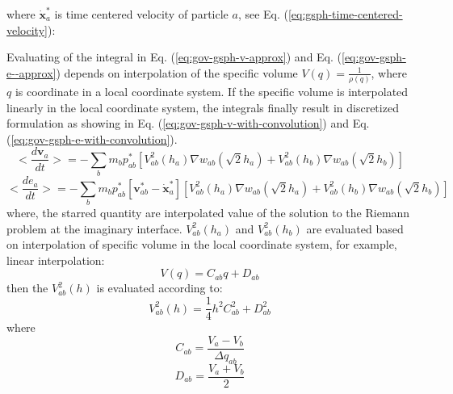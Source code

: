where $\dot{\textbf{x}}_{a}^{\ast}$ is time centered velocity of particle $a$, see Eq. (\ref{eq:gsph-time-centered-velocity}):

Evaluating of the integral in Eq. (\ref{eq:gov-gsph-v-approx}) and Eq. (\ref{eq:gov-gsph-e--approx}) depends on interpolation of the specific volume $V(q) = \frac{1}{\rho(q)}$, where $q$ is coordinate in a local coordinate system. If the specific volume is interpolated linearly in the local coordinate system, the integrals finally result in discretized formulation as showing in Eq. (\ref{eq:gov-gsph-v-with-convolution}) and Eq. (\ref{eq:gov-gsph-e-with-convolution}).
\begin{equation}
<\dfrac{d \textbf{v}_{a}}{dt}>= -\sum_{b} m_{b} p_{a b}^{\ast} \left[ V_{ab}^2(h_a) \nabla w_{a b}(\sqrt{2} h_{a}) + V_{ab}^2(h_b) \nabla w_{a b}(\sqrt{2} h_{b}) \right]
\label{eq:gov-gsph-v-with-convolution}
\end{equation}
\begin{equation}
<\dfrac{d e_{a}}{dt}>= - \sum_{b} m_{b} p_{a b}^{\ast} [\textbf{v}_{a b}^{\ast} - \dot{\textbf{x}}_{a}^{\ast}] \left[V_{ab}^2(h_a) \nabla w_{a b}(\sqrt{2} h_{a}) + V_{ab}^2(h_b) \nabla w_{a b}(\sqrt{2} h_{b}) \right]
\label{eq:gov-gsph-e-with-convolution}
\end{equation}
where, the starred quantity are interpolated value of the solution to the Riemann problem at the imaginary interface.
$V_{ab}^2(h_a)$ and $V_{ab}^2(h_b)$ are evaluated based on interpolation of specific volume in the local coordinate system, for example, linear interpolation: 
\begin{equation}
V(q) = C_{ab}q+D_{ab}
\label{eq:gsph-V-linear-interplation}
\end{equation}
then the $V^2_{ab}(h)$ is evaluated according to:
\begin{equation}
V^2_{ab}(h) = \frac{1}{4}h^2C_{ab}^2+D_{ab}^2
\label{eq:gsph-V-linear-interplation-sq}
\end{equation}
where
\begin{equation}
C_{ab} = \frac{V_a-V_b}{\Delta q_{ab}}
\label{eq:gsph-V-linear-interplation-C}
\end{equation}
\begin{equation}
D_{ab} = \frac{V_a+V_b}{2}
\label{eq:gsph-V-linear-interplation-D}
\end{equation}
